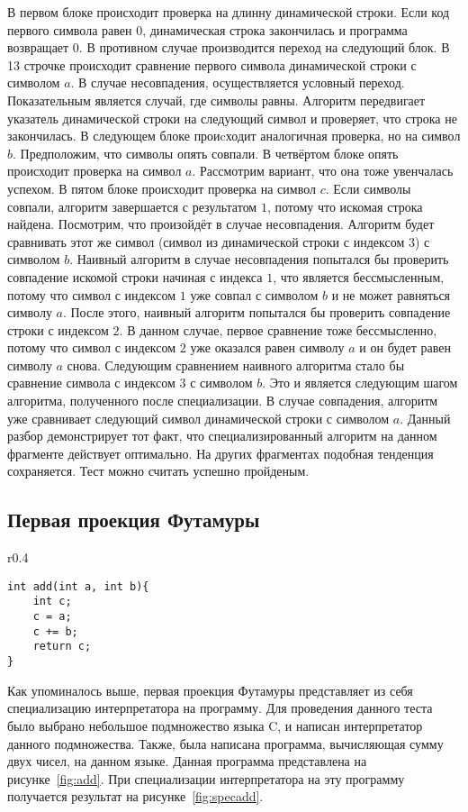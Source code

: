 В первом блоке происходит проверка на длинну динамической строки. Если код первого символа равен $0$, динамическая строка закончилась и программа возвращает $0$. В противном случае производится переход на следующий блок. В 13 строчке происходит сравнение первого символа динамической строки с символом $a$. В случае несовпадения, осуществляется условный переход. Показательным является случай, где символы равны. Алгоритм передвигает указатель динамической строки на следующий символ и проверяет, что строка не закончилась. В следующем блоке проиcходит аналогичная проверка, но на символ $b$. Предположим, что символы опять совпали. В четвёртом блоке опять происходит проверка на символ $a$. Рассмотрим вариант, что она тоже увенчалась успехом. В пятом блоке происходит проверка на символ $c$. Если символы совпали, алгоритм завершается с результатом $1$, потому что искомая строка найдена. Посмотрим, что произойдёт в случае несовпадения. Алгоритм будет сравнивать этот же символ (символ из динамической строки с индексом 3) с символом $b$. Наивный алгоритм в случае несовпадения попытался бы проверить совпадение искомой строки начиная с индекса $1$, что является бессмысленным, потому что символ с индексом $1$ уже совпал с символом $b$ и не может равняться символу $a$.
После этого, наивный алгоритм попытался бы проверить совпадение строки с индексом $2$. В данном случае, первое сравнение тоже бессмысленно, потому что символ с индексом $2$ уже оказался равен символу $a$ и он будет равен символу $a$ снова. Следующим сравнением наивного алгоритма стало бы сравнение символа с индексом $3$ с символом $b$. Это и является следующим шагом алгоритма, полученного после специализации. В случае совпадения, алгоритм уже сравнивает следующий символ динамической строки с символом $a$. Данный разбор демонстрирует тот факт, что специализированный алгоритм на данном фрагменте действует оптимально. На других фрагментах подобная тенденция сохраняется. Тест можно считать успешно пройденым.

\subsection{ Первая проекция Футамуры}

\begin{wrapfigure}{r}{0.4\textwidth}
\vspace{-1cm}
\begin{lstlisting}[xleftmargin = 20pt]
int add(int a, int b){
    int c;
    c = a;
    c += b;
    return c;
}
\end{lstlisting}
\caption{Сумма двух чисел}
\vspace{-0.7cm}
\label{fig:add}
\end{wrapfigure}
Как упоминалось выше, первая проекция Футамуры представляет из себя специализацию интерпретатора на программу. Для проведения данного теста было выбрано небольшое подмножество языка \textsf{C}, и написан интерпретатор данного подмножества. Также, была написана программа, вычисляющая сумму двух чисел, на данном языке. Данная программа представлена на рисунке~\ref{fig:add}.
При специализации интерпретатора на эту программу получается результат на рисунке~\ref{fig:specadd}.

